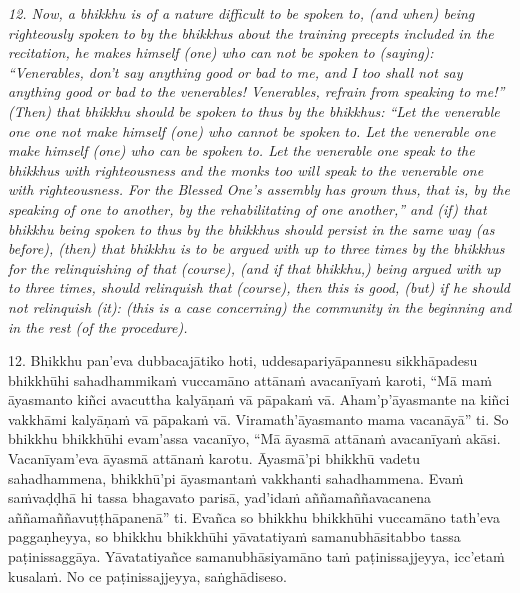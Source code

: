 \documentclass[11pt]{article}
\begin{document}
\begin{paracol}{2}
\begin{column}
{\itshape\footnotesize
12. Now, a bhikkhu is of a nature difficult to be spoken to, (and when) being righteously spoken to by the bhikkhus about the training precepts included in the recitation, he makes himself (one) who can not be spoken to (saying): “Venerables, don't say anything good or bad to me, and I too shall not say anything good or bad to the venerables! Venerables, refrain from speaking to me!” (Then) that bhikkhu should be spoken to thus by the bhikkhus: “Let the venerable one one not make himself (one) who cannot be spoken to. Let the venerable one make himself (one) who can be spoken to. Let the venerable one speak to the bhikkhus with righteousness and the monks too will speak to the venerable one with righteousness. For the Blessed One's assembly has grown thus, that is, by the speaking of one to another, by the rehabilitating of one another,” and (if) that bhikkhu being spoken to thus by the bhikkhus should persist in the same way (as before), (then) that bhikkhu is to be argued with up to three times by the bhikkhus for the relinquishing of that (course), (and if that bhikkhu,) being argued with up to three times, should relinquish that (course), then this is good, (but) if he should not relinquish (it): (this is a case concerning) the community in the beginning and in the rest (of the procedure).
}
\switchcolumn

\begin{flushleft}
12. Bhikkhu pan’eva dubbacajātiko hoti, uddesapariyāpannesu sikkhāpadesu bhikkhūhi sahadhammikaṁ vuccamāno attānaṁ avacanīyaṁ karoti, “Mā maṁ āyasmanto kiñci avacuttha kalyāṇaṁ vā pāpakaṁ vā. Aham’p’āyasmante na kiñci vakkhāmi kalyāṇaṁ vā pāpakaṁ vā. Viramath’āyasmanto mama vacanāyā” ti. So bhikkhu bhikkhūhi evam’assa vacanīyo, “Mā āyasmā attānaṁ avacanīyaṁ akāsi. Vacanīyam’eva āyasmā attānaṁ karotu. Āyasmā’pi bhikkhū vadetu sahadhammena, bhikkhū’pi āyasmantaṁ vakkhanti sahadhammena. Evaṁ saṁvaḍḍhā hi tassa bhagavato parisā, yad’idaṁ aññamaññavacanena aññamaññavuṭṭhāpanenā” ti. Evañca so bhikkhu bhikkhūhi vuccamāno tath’eva paggaṇheyya, so bhikkhu bhikkhūhi yāvatatiyaṁ samanubhāsitabbo tassa paṭinissaggāya. Yāvatatiyañce samanubhāsiyamāno taṁ paṭinissajjeyya, icc’etaṁ kusalaṁ. No ce paṭinissajjeyya, saṅghādiseso.
\switchcolumn*
\end{flushleft}


\end{column}
\end{paracol}
\end{document}
